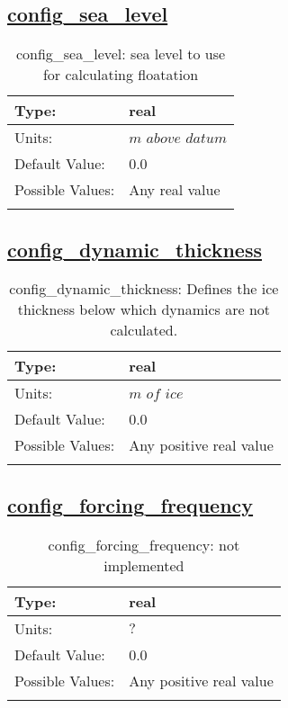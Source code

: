 \subsection[config\_sea\_level]{\hyperref[sec:nm_tab_li_model]{config\_sea\_level}}
\label{subsec:nm_sec_config_sea_level}
\begin{center}
\begin{longtable}{| p{2.0in} | p{4.0in} |}
    \hline
    Type: & real \\
    \hline
    Units: & $m$ $above$ $datum$ \\
    \hline
    Default Value: & 0.0 \\
    \hline
    Possible Values: & Any real value \\
    \hline
    \caption{config\_sea\_level: sea level to use for calculating floatation}
\end{longtable}
\end{center}
\subsection[config\_dynamic\_thickness]{\hyperref[sec:nm_tab_li_model]{config\_dynamic\_thickness}}
\label{subsec:nm_sec_config_dynamic_thickness}
\begin{center}
\begin{longtable}{| p{2.0in} | p{4.0in} |}
    \hline
    Type: & real \\
    \hline
    Units: & $m$ $of$ $ice$ \\
    \hline
    Default Value: & 0.0 \\
    \hline
    Possible Values: & Any positive real value \\
    \hline
    \caption{config\_dynamic\_thickness: Defines the ice thickness below which dynamics are not calculated.}
\end{longtable}
\end{center}
\subsection[config\_forcing\_frequency]{\hyperref[sec:nm_tab_li_model]{config\_forcing\_frequency}}
\label{subsec:nm_sec_config_forcing_frequency}
\begin{center}
\begin{longtable}{| p{2.0in} | p{4.0in} |}
    \hline
    Type: & real \\
    \hline
    Units: & $?$ \\
    \hline
    Default Value: & 0.0 \\
    \hline
    Possible Values: & Any positive real value \\
    \hline
    \caption{config\_forcing\_frequency: not implemented}
\end{longtable}
\end{center}
